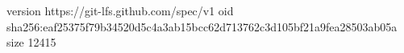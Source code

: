 version https://git-lfs.github.com/spec/v1
oid sha256:eaf25375f79b34520d5c4a3ab15bcc62d713762c3d105bf21a9fea28503ab05a
size 12415
